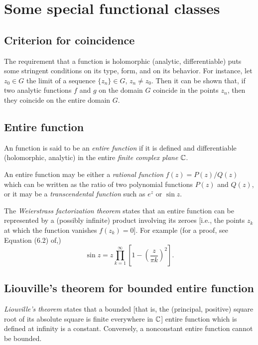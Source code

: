 \section{Some special functional classes}

\subsection{Criterion for coincidence}

The requirement that a function is holomorphic (analytic, differentiable)
puts some stringent conditions on its type, form, and on its behavior.
For instance,
let
$z_0\in G$ the limit of a sequence
$\{z_n\}\in G$, $z_n\ne z_0$.
Then it can be shown that,
if two analytic functions
$f$ and $g$
on the domain $G$  coincide in the points $z_n$,
then they coincide on the entire domain $G$.

\subsection{Entire function}

An function is said to be an {\em entire function}
if it is defined and differentiable (holomorphic, analytic)
in the entire {\em finite complex plane} ${\Bbb C}$.

An entire function may be
either a
{\em rational function}
$f(z)=P(z)/Q(z)$
which can be written as the ratio of two polynomial functions
$P(z)$ and $Q(z)$,
or it may be a
{\em transcendental function}
such as $e^z$ or $\sin z$.


The
{\em  Weierstrass factorization theorem}
states that an entire function can be represented by a
(possibly infinite\cite{Gamelin-ca})
product involving its zeroes [i.e., the points $z_k$
at which the function vanishes $f(z_k)=0$].
For example (for a proof, see Equation (6.2) of,\cite{conway-focvI})
\begin{equation}
\sin z = z \prod_{k=1}^\infty \left[ 1-  \left(\frac{z}{\pi k}\right)^2\right].
\end{equation}


\subsection{Liouville's theorem for bounded entire function}
\label{2012-m-ch-ca-lt}
{\em Liouville's theorem}
states that
a bounded [that is, the (principal, positive)
square root of its absolute square is finite everywhere in ${\Bbb C}$]
entire function which is defined at infinity
is a constant.
Conversely, a nonconstant entire function cannot be bounded.


